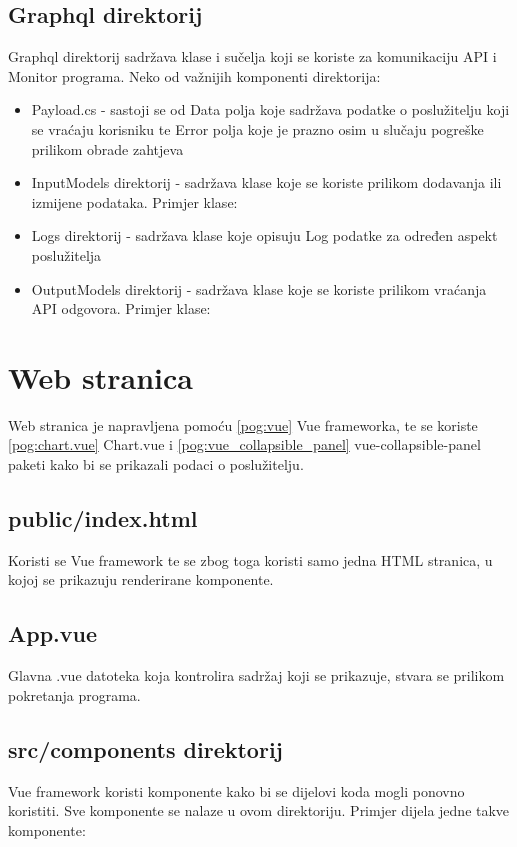 \documentclass[zavrsnirad]{fer}
\begin{document}
\subsection{Graphql direktorij}
Graphql direktorij sadržava klase i sučelja koji se koriste za komunikaciju API i Monitor programa.
Neko od važnijih komponenti direktorija:
\begin{itemize}
	\item Payload.cs - sastoji se od Data polja koje sadržava podatke o poslužitelju koji se vraćaju korisniku te Error polja koje je prazno osim u slučaju pogreške prilikom obrade zahtjeva
	\item InputModels direktorij - sadržava klase koje se koriste prilikom dodavanja ili izmijene podataka. Primjer klase:
	
	\item Logs direktorij - sadržava klase koje opisuju Log podatke za određen aspekt poslužitelja
	\item OutputModels direktorij - sadržava klase koje se koriste prilikom vraćanja API odgovora. Primjer klase:
	
\end{itemize}

\section{Web stranica}
Web stranica je napravljena pomoću \ref{pog:vue} Vue frameworka, te se koriste \ref{pog:chart.vue} Chart.vue i \ref{pog:vue_collapsible_panel} vue-collapsible-panel paketi kako bi se prikazali podaci o poslužitelju.

\subsection{public/index.html}
Koristi se Vue framework te se zbog toga koristi samo jedna HTML stranica, u kojoj se prikazuju renderirane komponente.

\subsection{App.vue}
Glavna .vue datoteka koja kontrolira sadržaj koji se prikazuje, stvara se prilikom pokretanja programa.

\subsection{src/components direktorij}
Vue framework koristi komponente kako bi se dijelovi koda mogli ponovno koristiti. Sve komponente se nalaze u ovom direktoriju. Primjer dijela jedne takve komponente:

\end{document}
